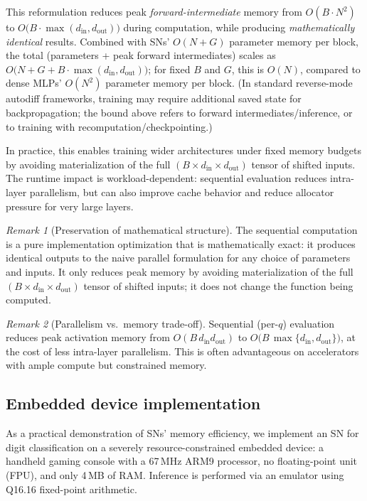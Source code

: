 \documentclass{article}
\theoremstyle{plain}
\theoremstyle{definition}
\theoremstyle{remark}
\newtheorem{remark}{Remark}
\begin{document}
This reformulation reduces peak \emph{forward-intermediate} memory from $O(B \cdot N^2)$ to $O\!\bigl(B \cdot \max(d_{\mathrm{in}}, d_{\mathrm{out}})\bigr)$ during computation, while producing \emph{mathematically identical} results. Combined with SNs' $O(N+G)$ parameter memory per block, the total (parameters + peak forward intermediates) scales as $O\!\bigl(N+G + B \cdot \max(d_{\mathrm{in}}, d_{\mathrm{out}})\bigr)$; for fixed $B$ and $G$, this is $O(N)$, compared to dense MLPs' $O(N^2)$ parameter memory per block. (In standard reverse-mode autodiff frameworks, training may require additional saved state for backpropagation; the bound above refers to forward intermediates/inference, or to training with recomputation/checkpointing.)

In practice, this enables training wider architectures under fixed memory budgets by avoiding materialization of the full $(B\times d_{\mathrm{in}}\times d_{\mathrm{out}})$ tensor of shifted inputs. The runtime impact is workload-dependent: sequential evaluation reduces intra-layer parallelism, but can also improve cache behavior and reduce allocator pressure for very large layers.

\begin{remark}[Preservation of mathematical structure]
The sequential computation is a pure implementation optimization that is mathematically exact: it produces identical outputs to the naive parallel formulation for any choice of parameters and inputs. It only reduces peak memory by avoiding materialization of the full $(B\times d_{\mathrm{in}}\times d_{\mathrm{out}})$ tensor of shifted inputs; it does not change the function being computed.
\end{remark}

\begin{remark}[Parallelism vs.\ memory trade-off]
Sequential (per-$q$) evaluation reduces peak activation memory from $O(B\,d_{\mathrm{in}} d_{\mathrm{out}})$ to $O\bigl(B\,\max\{d_{\mathrm{in}}, d_{\mathrm{out}}\}\bigr)$, at the cost of less intra-layer parallelism. This is often advantageous on accelerators with ample compute but constrained memory. 
\end{remark}

\subsection{Embedded device implementation}
\label{sec:embedded}

As a practical demonstration of SNs' memory efficiency, we implement an SN for digit classification on a severely resource-constrained embedded device: a handheld gaming console with a 67\,MHz ARM9 processor, no floating-point unit (FPU), and only 4\,MB of RAM. Inference is performed via an emulator using Q16.16 fixed-point arithmetic.
\end{document}
